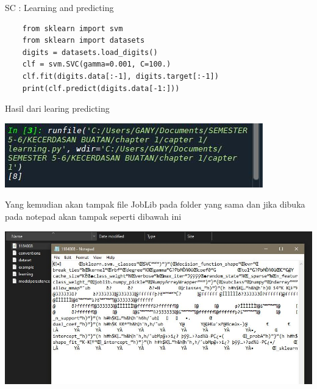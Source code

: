 \begin{enumerate}
\begin{center}
    \end{center}
    SC : Learning and predicting
    \begin{verbatim}
    from sklearn import svm 
    from sklearn import datasets 
    digits = datasets.load_digits() 
    clf = svm.SVC(gamma=0.001, C=100.) 
    clf.fit(digits.data[:-1], digits.target[:-1])
    print(clf.predict(digits.data[-1:]))    
    \end{verbatim}
    Hasil dari learing predicting 
    \begin{center}
    \includegraphics[width=.8\textwidth]{figures/1184008/chapter1/4a.JPG}
    \end{center}
    Yang kemudian akan tampak file JobLib pada folder yang sama dan jika dibuka pada notepad akan tampak seperti dibawah ini
     \begin{center}
    \includegraphics[width=.8\textwidth]{figures/1184008/chapter1/4b.JPG}
    \end{center}
   

\end{enumerate}
